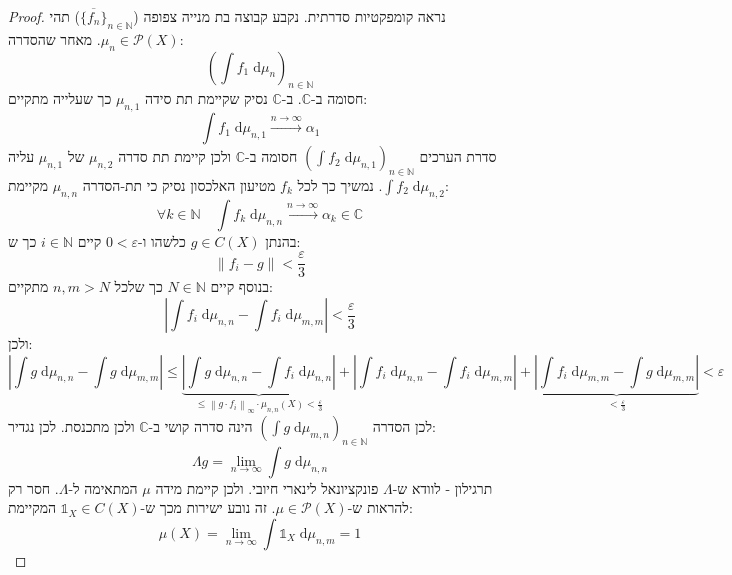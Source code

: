 \documentclass{tstextbook}
\begin{document}
\begin{proof}
נראה קומפקטיות סדרתית. נקבע קבוצה בת מנייה צפופה (\(\overline{\{ f_{n} \}}_{n \in \mathbb{N}}\)) תהי \(\mu_{n}\in \mathcal{P}(X)\). מאחר שהסדרה:
$$\left( \int f_{1} \;\mathrm{d} \mu_{n}  \right)_{n \in \mathbb{N}}$$
חסומה ב-\(\mathbb{C}\). ב-\(\mathbb{C}\) נסיק שקיימת תת סידה \(\mu_{n,1}\) כך שעלייה מתקיים:
$$\int f_{1} \;\mathrm{d} \mu_{n,1}\xrightarrow{n\to \infty}\alpha_{1} $$
סדרת הערכים \(\left( \int f_{2} \;\mathrm{d} \mu_{n,1} \right)_{n\in \mathbb{N}}\) חסומה ב-\(\mathbb{C}\) ולכן קיימת תת סדרה \(\mu_{n,2}\) של \(\mu_{n,1}\) עליה \(\int f_{2} \;\mathrm{d} \mu_{n,2}\). נמשיך כך לכל \(f_{k}\) מטיעון האלכסון נסיק כי תת-הסדרה \(\mu_{n,n}\) מקיימת:
$$\forall k \in \mathbb{N} \quad  \int f_{k} \;\mathrm{d} \mu_{n,n}\xrightarrow{n\to \infty} \alpha_{k}\in \mathbb{C} $$
בהנתן \(g \in C(X)\) כלשהו ו-\(0<\varepsilon\) קיים \(i \in \mathbb{N}\) כך ש:
$$\lVert f_{i}-g \rVert < \frac{\varepsilon}{3}$$
בנוסף קיים \(N \in \mathbb{N}\) כך שלכל \(n,m> N\) מתקיים:
$$\left\lvert  \int f_{i} \;\mathrm{d} \mu_{n,n}-\int f_{i} \;\mathrm{d} \mu_{m,m}    \right\rvert < \frac{\varepsilon}{3}$$
ולכן:
$$\left\lvert  \int g \;\mathrm{d} \mu_{n,n}-\int g \;\mathrm{d} \mu_{m,m}    \right\rvert \leq \underbrace{ \left\lvert  \int g \;\mathrm{d} \mu_{n,n}-\int f_{i} \;\mathrm{d} \mu_{n,n}    \right\rvert }_{ \leq \left\lVert  g\cdot f_{i}  \right\rVert _{\infty}\cdot \mu_{n,n}(X)<\frac{\varepsilon}{3} } +\left\lvert  \int f_{i} \;\mathrm{d} \mu_{n,n}   -\int f_{i} \;\mathrm{d} \mu_{m,m} \right\rvert +\underbrace{ \left\lvert  \int f_{i} \;\mathrm{d} \mu_{m,m} - \int g \;\mathrm{d} \mu_{m,m}    \right\rvert }_{ <\frac{\varepsilon}{3} } <\varepsilon$$
לכן הסדרה \(\left( \int g \;\mathrm{d} \mu_{m,n} \right)_{n \in \mathbb{N}}\) הינה סדרה קושי ב-\(\mathbb{C}\) ולכן מתכנסת. לכן נגדיר:
$$\Lambda g= \lim_{  n \to \infty }  \int g \;\mathrm{d} \mu_{n,n} $$
תרגילון - לוודא ש-\(\Lambda\) פונקציונאל לינארי חיובי. ולכן קיימת מידה \(\mu\) המתאימה ל-\(\Lambda\). חסר רק להראות ש-\(\mu \in \mathcal{P}(X)\). זה נובע ישירות מכך ש-\(\mathbb{1}_{X}\in C(X)\) המקיימת:
$$\mu(X)=\lim_{ n \to \infty } \int \mathbb{1} _{X} \;\mathrm{d} \mu_{n,m} = 1 $$

\end{proof}
\end{document}
